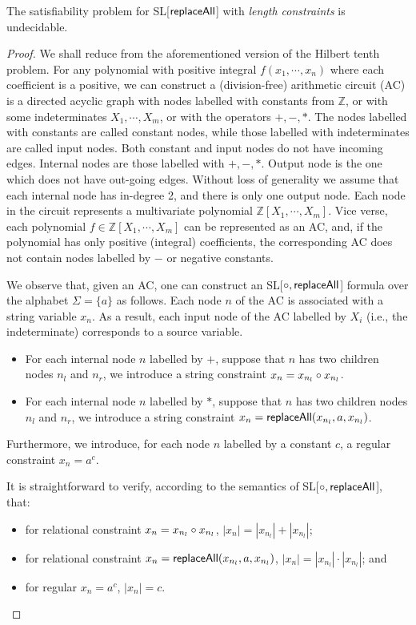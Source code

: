 \begin{theorem}
	The satisfiability problem for SL[$\mathsf{replaceAll}$] with \emph{length constraints} is undecidable. 
\end{theorem}

\begin{proof}
	We shall reduce from the aforementioned version of the Hilbert tenth problem. For any polynomial with positive integral  $f(x_1, \cdots, x_n)$ where each coefficient is a positive, we can construct a (division-free) arithmetic circuit (AC) is a directed  acyclic graph with nodes labelled with constants from $\mathbb{Z}$, or with some indeterminates $X_1, \cdots, X_m$, or with the operators $+, -, *$. The nodes labelled with constants are called constant nodes, while those labelled with indeterminates are called input nodes. Both constant and input nodes do not have incoming edges. Internal nodes are those labelled with $+,-,*$. Output node is the one which does not have out-going edges. Without loss of generality we assume that each internal node has in-degree 2, and there is only one output node. Each node in the circuit represents a multivariate polynomial $\mathbb{Z}[X_1, \cdots, X_m]$. Vice verse, each polynomial $f\in \mathbb{Z}[X_1, \cdots, X_m]$ can be represented as an AC, and, if the polynomial has only positive (integral) coefficients, the corresponding AC does not contain nodes labelled by $-$ or negative constants.  
	
	We observe that, given an AC, one can construct an SL[$\circ, \mathsf{replaceAll}$] formula over the alphabet $\Sigma=\{a\}$ as follows. Each node $n$ of the AC is associated with a string variable $x_n$. As a result, each input node of the AC labelled by $X_i$ (i.e., the indeterminate) corresponds to a  source variable.   
	\begin{itemize}
		\item For each internal node $n$ labelled by $+$, suppose that $n$ has two children nodes $n_l$ and $n_r$, we introduce a string constraint $x_n= x_{n_l}\circ x_{n_l}$.  
		
		\item For each internal node $n$ labelled by $*$, suppose that $n$ has two children nodes $n_l$ and $n_r$, we introduce a string constraint $x_n= \mathsf{replaceAll}(x_{n_l}, a, x_{n_l})$.  		
	\end{itemize}
Furthermore, we introduce, for each node $n$ labelled by a constant $c$, a regular constraint $x_n=a^c$. 

It is straightforward to verify, according to the semantics of SL[$\circ, \mathsf{replaceAll}$], that:
\begin{itemize}
	\item for relational constraint $x_n= x_{n_l}\circ x_{n_l}$, $|x_n|= |x_{n_l}|+|x_{n_l}|$; 
	\item for relational constraint $x_n= \mathsf{replaceAll}(x_{n_l}, a, x_{n_l})$,  $|x_n|= |x_{n_l}|\cdot |x_{n_l}|$; and 
	\item for regular $x_n=a^c$, $|x_n|=c$. 
\end{itemize}


\end{proof}
